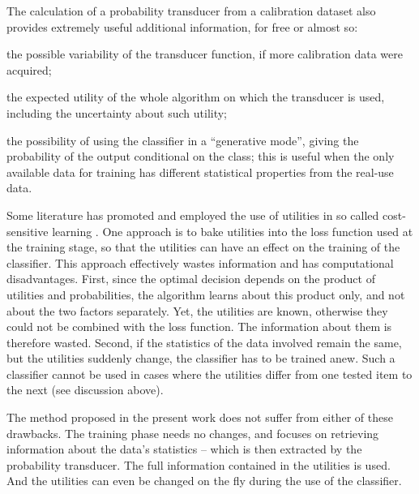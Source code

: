 \documentclass[a4paper,12pt,%
onecolumn,oneside,article,%
british%
]{memoir}
\renewcommand*{\|}[1][]{\nonscript\:#1\vert\nonscript\:\mathopen{}}
\newcommand*{\sects}{\S\S}%
\begin{document}
The calculation of a probability transducer from a calibration dataset also provides extremely useful additional information, for free or almost so:
\begin{enumerate*}[label=(\alph*)]
\item the possible variability of the transducer function, if more calibration data were acquired; 
\item the expected utility of the whole algorithm on which the transducer is used, including the uncertainty about such utility;
\item the possibility of using the classifier in a \enquote{generative mode}, giving the probability of the output conditional on the class; this is useful when the only available data for training has different statistical properties from the real-use data.
\end{enumerate*}

\medskip

Some literature has promoted and employed the use of utilities in so called cost-sensitive learning \autocites{elkan2001,correabahnsenetal2015,lingetal2017}. One approach is to bake utilities into the loss function used at the training stage, so that the utilities can have an effect on the training of the classifier. This approach effectively wastes information and has computational disadvantages. First, since the optimal decision depends on the product of utilities and probabilities, the algorithm learns about this product only, and not about the two factors separately. \autocites[In][\sects~2--3, for example, the decision threshold of the algorithm is changed by making the algorithm  learn wrong class probabilities on purpose]{elkan2001} Yet, the utilities are known, otherwise they could not be combined with the loss function. The information about them is therefore wasted. Second, if the statistics of the data involved remain the same, but the utilities suddenly change, the classifier has to be trained anew. Such a classifier cannot be used in cases where the utilities differ from one tested item to the next (see discussion above).

The method proposed in the present work does not suffer from either of these drawbacks. The training phase needs no changes, and focuses on retrieving information about the data's statistics -- which is then extracted by the probability transducer. The full information contained in the utilities is used. And the utilities can even be changed on the fly during the use of the classifier.
\end{document}

